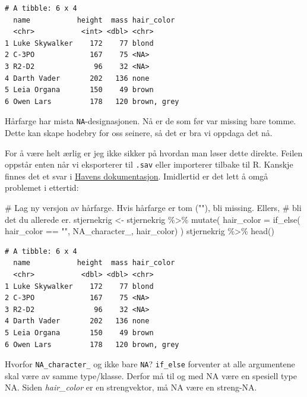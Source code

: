 \documentclass[
  letterpaper,
  DIV=11,
  numbers=noendperiod]{scrreprt}
\newenvironment{Shaded}{\begin{snugshade}}{\end{snugshade}}
\newcommand{\AttributeTok}[1]{\textcolor[rgb]{0.40,0.45,0.13}{#1}}
\newcommand{\CommentTok}[1]{\textcolor[rgb]{0.37,0.37,0.37}{#1}}
\newcommand{\ConstantTok}[1]{\textcolor[rgb]{0.56,0.35,0.01}{#1}}
\newcommand{\FunctionTok}[1]{\textcolor[rgb]{0.28,0.35,0.67}{#1}}
\newcommand{\NormalTok}[1]{\textcolor[rgb]{0.00,0.23,0.31}{#1}}
\newcommand{\OtherTok}[1]{\textcolor[rgb]{0.00,0.23,0.31}{#1}}
\newcommand{\SpecialCharTok}[1]{\textcolor[rgb]{0.37,0.37,0.37}{#1}}
\newcommand{\StringTok}[1]{\textcolor[rgb]{0.13,0.47,0.30}{#1}}
\begin{document}
\begin{verbatim}
# A tibble: 6 x 4
  name           height  mass hair_color 
  <chr>           <int> <dbl> <chr>      
1 Luke Skywalker    172    77 blond      
2 C-3PO             167    75 <NA>       
3 R2-D2              96    32 <NA>       
4 Darth Vader       202   136 none       
5 Leia Organa       150    49 brown      
6 Owen Lars         178   120 brown, grey
\end{verbatim}

Hårfarge har mista \texttt{NA}-designasjonen. Nå er de som før var
missing bare tomme. Dette kan skape hodebry for oss seinere, så det er
bra vi oppdaga det nå.

For å være helt ærlig er jeg ikke sikker på hvordan man løser dette
direkte. Feilen oppstår enten når vi eksporterer til \texttt{.sav} eller
importerer tilbake til R. Kanskje finnes det et svar i
\href{https://haven.tidyverse.org/articles/semantics.html\#tagged-missing-values}{Havens
dokumentasjon}. Imidlertid er det lett å omgå problemet i ettertid:

\begin{Shaded}
\begin{Highlighting}[]
\CommentTok{\# Lag ny versjon av hårfarge. Hvis hårfarge er tom (""), bli missing. Ellers, }
\CommentTok{\# bli det du allerede er. }
\NormalTok{stjernekrig }\OtherTok{\textless{}{-}}\NormalTok{ stjernekrig }\SpecialCharTok{\%\textgreater{}\%} 
  \FunctionTok{mutate}\NormalTok{(}
    \AttributeTok{hair\_color =} \FunctionTok{if\_else}\NormalTok{(}
\NormalTok{      hair\_color }\SpecialCharTok{==} \StringTok{""}\NormalTok{, }
      \ConstantTok{NA\_character\_}\NormalTok{, }
\NormalTok{      hair\_color)}
\NormalTok{    )}
\NormalTok{stjernekrig }\SpecialCharTok{\%\textgreater{}\%} \FunctionTok{head}\NormalTok{()}
\end{Highlighting}
\end{Shaded}

\begin{verbatim}
# A tibble: 6 x 4
  name           height  mass hair_color 
  <chr>           <dbl> <dbl> <chr>      
1 Luke Skywalker    172    77 blond      
2 C-3PO             167    75 <NA>       
3 R2-D2              96    32 <NA>       
4 Darth Vader       202   136 none       
5 Leia Organa       150    49 brown      
6 Owen Lars         178   120 brown, grey
\end{verbatim}

Hvorfor \texttt{NA\_character\_} og ikke bare \texttt{NA}?
\texttt{if\_else} forventer at alle argumentene skal være av samme
type/klasse. Derfor må til og med NA være en spesiell type NA. Siden
\emph{hair\_color} er en strengvektor, må NA være en streng-NA.
\end{document}
